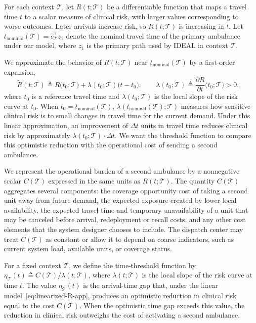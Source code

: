 \documentclass[11pt, letterpaper, oneside, reqno]{amsart}
\newcommand{\Let}{\triangleq}
\begin{document}
For each context $\mathcal T$, let $R(t;\mathcal T)$ be a differentiable function that maps a travel time $t$ to a scalar measure of clinical risk, with larger values corresponding to worse outcomes. Later arrivals increase risk, so $R(t;\mathcal T)$ is increasing in $t$. Let $t_{\text{nominal}}(\mathcal T) = \hat c_{\mathcal T}^\top z_1$ denote the nominal travel time of the primary ambulance under our model, where $z_1$ is the primary path used by IDEAL in context $\mathcal T$.

We approximate the behavior of $R(t;\mathcal T)$ near $t_{\text{nominal}}(\mathcal T)$ by a first-order expansion,
\begin{equation}
\label{eq:linearized-R-app}
\widetilde R(t;\mathcal T) \Let R\bigl(t_0;\mathcal T\bigr)
 + \lambda(t_0;\mathcal T)\bigl(t - t_0\bigr),
\qquad
\lambda(t_0;\mathcal T) \Let \frac{\partial R}{\partial t}\bigl(t_0;\mathcal T\bigr) > 0,
\end{equation}
where $t_0$ is a reference travel time and $\lambda(t_0;\mathcal T)$ is the local slope of the risk curve at $t_0$. When $t_0 = t_{\text{nominal}}(\mathcal T)$, $\lambda(t_{\text{nominal}}(\mathcal T);\mathcal T)$ measures how sensitive clinical risk is to small changes in travel time for the current demand.
Under this linear approximation, an improvement of $\Delta t$ units in travel time reduces clinical risk by approximately $\lambda(t_0;\mathcal T)\cdot\Delta t$. We want the threshold function to compare this optimistic reduction with the operational cost of sending a second ambulance.

We represent the operational burden of a second ambulance by a nonnegative scalar $C(\mathcal T)$ expressed in the same units as $R(t;\mathcal T)$. The quantity $C(\mathcal T)$ aggregates several components: the coverage opportunity cost of taking a second unit away from future demand, the expected exposure created by lower local availability, the expected travel time and temporary unavailability of a unit that may be canceled before arrival, redeployment or recall costs, and any other cost elements that the system designer chooses to include. The dispatch center may treat $C(\mathcal T)$ as constant or allow it to depend on coarse indicators, such as current system load, available units, or coverage status.

For a fixed context $\mathcal T$, we define the time-threshold function by $\eta_{\mathcal T}(t) \Let C(\mathcal T) / \lambda(t;\mathcal T)$,
where $\lambda(t;\mathcal T)$ is the local slope of the risk curve at time $t$. The value $\eta_{\mathcal T}(t)$ is the arrival-time gap that, under the linear model~\eqref{eq:linearized-R-app}, produces an optimistic reduction in clinical risk equal to the cost $C(\mathcal T)$. When the optimistic time gap exceeds this value, the reduction in clinical risk outweighs the cost of activating a second ambulance.
\end{document}
